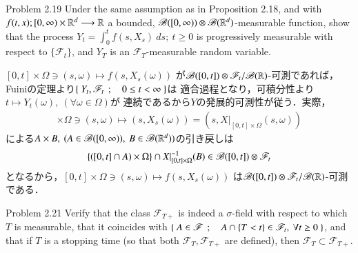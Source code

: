 	\begin{itembox}[l]{Problem 2.19}
		Under the same assumption as in Proposition 2.18, and with 
		$f(t,x);[0,\infty) \times \mathbb{R}^d \longrightarrow \mathbb{R}$ a bounded,
		$\mathscr{B}([0,\infty)) \otimes \mathscr{B}(\mathbb{R}^d)$-measurable function,
		show that the process $Y_t = \int_0^t f(s,X_s)\ ds;\ t \geq 0$ is
		progressively measurable with respect to $\{\mathscr{F}_t\}$, 
		and  $Y_T$ is an $\mathscr{F}_T$-measurable random variable.
	\end{itembox}
	
	\begin{prf}
		$[0,t] \times \Omega \ni (s,\omega) \longmapsto f(s,X_s(\omega))$
		が$\mathscr{B}([0,t]) \otimes \mathscr{F}_t/\mathscr{B}(\mathbb{R})$-可測であれば，
		Fuiniの定理より$\left\{\ Y_t,\mathscr{F}_t\ \, ; \quad 0 \leq t < \infty\ \right\}$は
		適合過程となり，可積分性より$t \longmapsto Y_t(\omega),\ (\forall \omega \in \Omega)$が
		連続であるから$Y$の発展的可測性が従う．実際，
		\begin{align}
			[0,t] \times \Omega \ni (s,\omega)
			\longmapsto \left( s,X_s(\omega)\right) 
			= \left( s,X|_{[0,t] \times \Omega}(s,\omega) \right)
		\end{align}
		による$A \times B,\ (A \in \mathscr{B}([0,\infty)),\ B \in \mathscr{B}(\mathbb{R}^d))$の引き戻しは
		\begin{align}
			\left\{ ([0,t] \cap A) \times \Omega \right\} \cap
			X|_{[0,t] \times \Omega}^{-1}(B)
			\in \mathscr{B}([0,t]) \otimes \mathscr{F}_t
		\end{align}
		となるから，$[0,t] \times \Omega \ni (s,\omega) \longmapsto f(s,X_s(\omega))$
		は$\mathscr{B}([0,t]) \otimes \mathscr{F}_t/\mathscr{B}(\mathbb{R})$-可測である．
		\QED
	\end{prf}
	
	\begin{itembox}[l]{Problem 2.21}
		Verify that the class $\mathscr{F}_{T+}$ is indeed a $\sigma$-field
		with respect to which $T$ is measurable, that it coincides with
		$\left\{\ A \in \mathscr{F}\ \, ; \quad A \cap \{T < t\} \in \mathscr{F}_t,\ \forall t \geq 0\ \right\}$,
		and that if $T$ is a stopping time (so that both $\mathscr{F}_T,\mathscr{F}_{T+}$
		are defined), then $\mathscr{F}_T \subset \mathscr{F}_{T+}$.
	\end{itembox}
	
